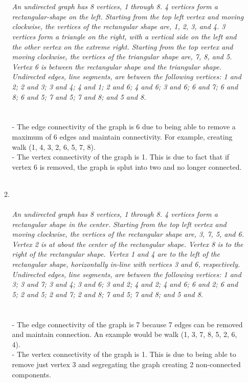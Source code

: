 \documentclass{amsart}
\theoremstyle{definition}
\theoremstyle{Exercise}
\theoremstyle{remark}
\theoremstyle{rule}
\numberwithin{equation}{section}
\begin{document}
\begin{enumerate}[label=(\alph*)]
\begin{enumerate}[label=(\roman*)]
{}
\\\\
{\color{blue}{\bf Figure 7:} \emph{An undirected graph has 8 vertices, 1 through 8. 4 vertices form a rectangular-shape on the left. Starting from the top left vertex and moving clockwise, the vertices of the rectangular shape are, 1, 2, 3, and 4. 3 vertices form a triangle on the right, with a vertical side on the left and the other vertex on the extreme right. Starting from the top vertex and moving clockwise, the vertices of the triangular shape are, 7, 8, and 5. Vertex 6 is between the rectangular shape and the triangular shape. Undirected edges, line segments, are between the following vertices: 1 and 2; 2 and 3; 3 and 4; 4 and 1; 2 and 6; 4 and 6; 3 and 6; 6 and 7; 6 and 8; 6 and 5; 7 and 5; 7 and 8; and 5 and 8.
\\
}
}
\\
\vspace*{0.2in}
\\
- The edge connectivity of the graph is 6 due to being able to remove a maximum of 6 edges and maintain connectivity. For example,
creating walk (1, 4, 3, 2, 6, 5, 7, 8).\\
- The vertex connectivity of the graph is 1. This is due to fact that if vertex 6 is removed, the graph is splut into two and no longer connected.
\\\\

\item  

\\\\
{\color{blue}{\bf Figure 8:} \emph{An undirected graph has 8 vertices, 1 through 8. 4 vertices form a rectangular shape in the center. Starting from the top left vertex and moving clockwise, the vertices of the rectangular shape are, 3, 7, 5, and 6. Vertex 2 is at about the center of the rectangular shape. Vertex 8 is to the right of the rectangular shape. Vertex 1 and 4 are to the left of the rectangular shape, horizontally in-line with vertices 3 and 6, respectively. Undirected edges, line segments, are between the following vertices: 1 and 3; 3 and 7; 3 and 4; 3 and 6; 3 and 2; 4 and 2; 4 and 6; 6 and 2; 6 and 5; 2 and 5; 2 and 7; 2 and 8; 7 and 5; 7 and 8; and 5 and 8. 
\\
}
}
\\
\\
- The edge connectivity of the graph is 7 because 7 edges can be removed and maintain connection. An example would be walk (1, 3, 7, 8, 5, 2, 6, 4).\\
- The vertex connectivity of the graph is 1. This is due to being able to remove just vertex 3 and segregating the graph creating 2 non-connected components.
\\\\
    \end{enumerate}
\end{enumerate}
\end{document}
